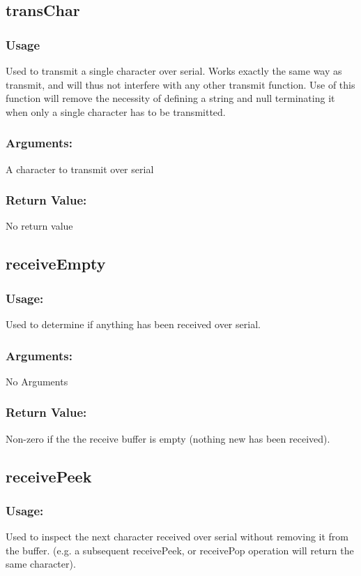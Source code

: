 \documentclass[]{report}
\begin{document}
\subsection{transChar}
\subsubsection{Usage}
Used to transmit a single character over serial. Works exactly the same way as transmit, and will thus not interfere with any other transmit function. Use of this function will remove the necessity of defining a string and null terminating it when only a single character has to be transmitted.

\subsubsection{Arguments:}
A character to transmit over serial

\subsubsection{Return Value:}
No return value

\subsection{receiveEmpty}
\subsubsection{Usage:}
Used to determine if anything has been received over serial.

\subsubsection{Arguments:}
No Arguments

\subsubsection{Return Value:}
Non-zero if the the receive buffer is empty (nothing new has been received).

\subsection{receivePeek}
\subsubsection{Usage:}
Used to inspect the next character received over serial without removing it from the buffer. (e.g. a subsequent receivePeek, or receivePop operation will return the same character).
\end{document}
